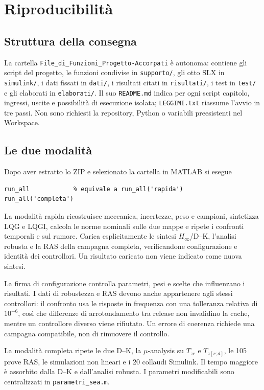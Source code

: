 \chapter{Riproducibilità}
\section{Struttura della consegna}
La cartella \texttt{File\_di\_Funzioni\_Progetto-Accorpati} è autonoma:
contiene gli script del progetto, le funzioni condivise in
\texttt{supporto/}, gli otto SLX in \texttt{simulink/}, i dati fissati in
\texttt{dati/}, i risultati citati in \texttt{risultati/}, i test in
\texttt{test/} e gli elaborati in \texttt{elaborati/}. Il suo
\texttt{README.md} indica per ogni script capitolo, ingressi, uscite e
possibilità di esecuzione isolata; \texttt{LEGGIMI.txt} riassume l'avvio
in tre passi. Non sono richiesti la repository, Python o variabili
preesistenti nel Workspace.

\section{Le due modalità}
Dopo aver estratto lo ZIP e selezionato la cartella in MATLAB si esegue
\begin{lstlisting}
run_all            % equivale a run_all('rapida')
run_all('completa')
\end{lstlisting}
La modalità rapida ricostruisce meccanica, incertezze, peso e campioni,
sintetizza LQG e LQGI, calcola le norme nominali sulle due mappe e ripete
i confronti temporali e sul rumore. Carica esplicitamente le sintesi
$H_\infty$/D--K, l'analisi robusta e la RAS della campagna completa,
verificandone configurazione e identità dei controllori. Un risultato
caricato non viene indicato come nuova sintesi.

La firma di configurazione controlla parametri, pesi e scelte che
influenzano i risultati. I dati di robustezza e RAS devono anche
appartenere agli stessi controllori: il confronto usa le risposte in
frequenza con una tolleranza relativa di $10^{-6}$, così che differenze
di arrotondamento tra release non invalidino la cache, mentre un
controllore diverso viene rifiutato. Un errore di coerenza richiede una
campagna compatibile, non di rimuovere il controllo.

La modalità completa ripete le due D--K, la $\mu$-analysis su
$T_{zr}$ e $T_{z[r;d]}$, le 105 prove RAS, le simulazioni non lineari e
i 20 collaudi Simulink. Il tempo maggiore è assorbito dalla D--K e
dall'analisi robusta. I parametri modificabili sono centralizzati in
\texttt{parametri\_sea.m}.

